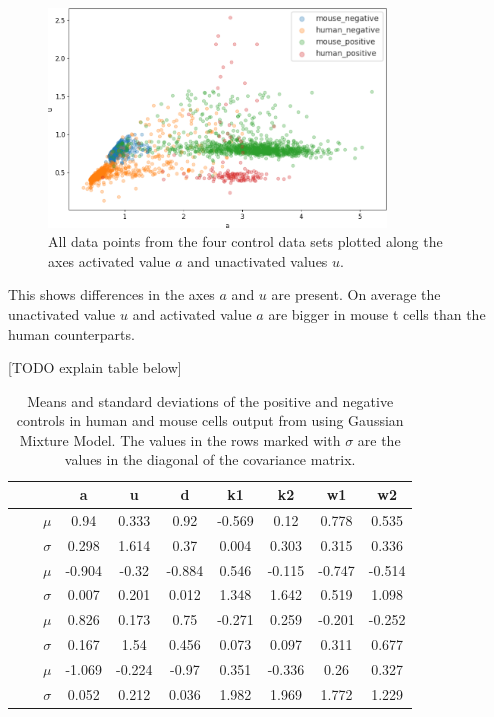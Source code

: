 \begin{figure}[h]
	\centering
	\includegraphics[width=0.8\textwidth]{fig/all_cells}
	
	\caption{All data points from the four control data sets plotted along the axes activated value $a$ and unactivated values $u$.}
	\label{fig:all_cells}
\end{figure}

This shows differences in the axes $a$ and $u$ are present. On average the unactivated value $u$ and activated value $a$ are bigger in mouse t cells than the human counterparts.

[TODO explain table below]

\begin{table}[h]
	\centering
	\begin{tabular}{|c|c|c|c|c|c|c|c|c|c|}
		\hline
		& & & a & u & d & k1 & k2 & w1 & w2\\
		\hline
		\multirow{4}{*}{\rotatebox[origin=c]{90}{mouse}} & \multirow{2}{*}{\rotatebox[origin=c]{90}{pos}} & $\mu$ & 0.94 & 0.333 & 0.92 & -0.569 & 0.12 & 0.778 & 0.535\\
		\cline{3-10}
		& & $\sigma$ & 0.298 & 1.614 & 0.37 & 0.004 & 0.303 & 0.315 & 0.336\\
		\cline{2-10}
		& \multirow{2}{*}{\rotatebox[origin=c]{90}{neg}} & $\mu$ & -0.904 & -0.32 & -0.884 & 0.546 & -0.115 & -0.747 & -0.514\\
		\cline{3-10}
		& & $\sigma$ & 0.007 & 0.201 & 0.012 & 1.348 & 1.642 & 0.519 & 1.098\\
		\hline
		\multirow{4}{*}{\rotatebox[origin=c]{90}{human}} & \multirow{2}{*}{\rotatebox[origin=c]{90}{pos}} & $\mu$ & 0.826 & 0.173 &  0.75 & -0.271 & 0.259 & -0.201 &	-0.252\\
		\cline{3-10}
		& & $\sigma$ & 0.167 & 1.54 & 0.456 & 0.073 & 0.097 & 0.311 & 0.677\\
		\cline{2-10}
		& \multirow{2}{*}{\rotatebox[origin=c]{90}{neg}} & $\mu$ & -1.069 & -0.224 & -0.97 & 0.351 & -0.336 & 0.26 &	0.327 \\
		\cline{3-10}
		& & $\sigma$ & 0.052 & 0.212 & 0.036 & 1.982 & 1.969 & 1.772 & 1.229\\
		\hline
	\end{tabular}
	\caption{Means and standard deviations of the positive and negative controls in human and mouse cells output from using Gaussian Mixture Model. The values in the rows marked with $\sigma$ are the values in the diagonal of the covariance matrix.}
	\label{tab:mean_std_clustering}
\end{table}


